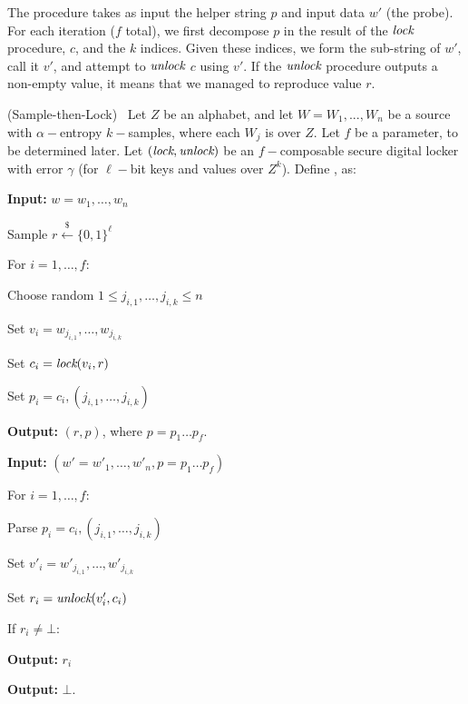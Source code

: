 The \rep procedure takes as input the helper string $p$ and input data $w'$ (the probe). For each iteration ($f$ total), we first decompose $p$ in the result of the $\textit{lock}$ procedure, $c$, and the $k$ indices. Given these indices, we form the sub-string of $w'$, call it $v'$, and attempt to $\textit{unlock}$ $c$ using $v'$. If the $\textit{unlock}$ procedure outputs a non-empty value, it means that we managed to reproduce value $r$.


\begin{construction}{(Sample-then-Lock)~\cite{reusablefe}}\label{constr:stl}
Let $Z$ be an alphabet, and let $W = W_1,...,W_n$ be a source with $\alpha-$entropy $k-$samples, where each $W_j$ is over $Z$. Let $f$ be a parameter, to be determined later. Let $(\textit{lock},\textit{unlock})$ be an $f-$composable secure digital locker with error $\gamma$ (for $\ell-$bit keys and values over $Z^k$). Define \gen, \rep as:

\footnotesize	

\begin{multicols}{2}
\gen

\textbf{Input:} $w = w_1,\dots,w_n$ 

Sample $r \xleftarrow{\$} \{0,1\}^\ell$

For $i = 1,\dots, f$:

        \quad Choose random $1 \leq j_{i,1},\dots, j_{i,k} \leq n$
        
        \quad Set $v_i = w_{j_{i,1}},\dots, w_{j_{i,k}}$ 
        
        \quad Set $c_i = \textit{lock}(v_i, r)$
        
        \quad Set $p_i = c_i, (j_{i,1},\dots, j_{i,k})$

\textbf{Output:} $(r,p)$, where $p = p_1 \dots p_f$.

\columnbreak
\rep

\textbf{Input:} $(w' = w'_1,\dots,w'_n, p = p_1 \dots p_f)$ 

For $i = 1,\dots, f$:

        \quad Parse $p_i = c_i, (j_{i,1},\dots, j_{i,k})$
        
        \quad Set $v'_i = w'_{j_{i,1}},\dots, w'_{j_{i,k}}$ 
        
        \quad Set $r_i = \textit{unlock}(v'_i, c_i)$
        
        \quad If $r_i \neq \bot$:
        
        \qquad\textbf{Output:}  $r_i$

\textbf{Output:} $\bot$.

\end{multicols}
\end{construction}

